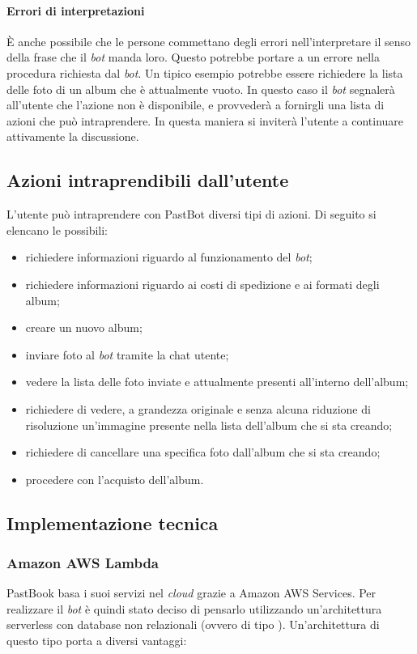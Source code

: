 \paragraph*{Errori di interpretazioni} È anche possibile che le persone
commettano degli errori nell'interpretare il senso della frase che il
\textit{bot} manda loro. Questo potrebbe portare a un errore nella procedura
richiesta dal \textit{bot}. Un tipico esempio potrebbe essere richiedere la
lista delle foto di un album che è attualmente vuoto. In questo caso il
\textit{bot} segnalerà all'utente che l'azione non è disponibile, e provvederà
a fornirgli una lista di azioni che può intraprendere. In questa maniera si
inviterà l'utente a continuare attivamente la discussione.

\subsection{Azioni intraprendibili dall'utente}

L'utente può intraprendere con PastBot diversi tipi di azioni. Di seguito si
elencano le possibili:

\begin{itemize}

  \item richiedere informazioni riguardo al funzionamento del \textit{bot};
  \item richiedere informazioni riguardo ai costi di spedizione e ai formati
degli album;
  \item creare un nuovo album;
  \item inviare foto al \textit{bot} tramite la chat utente;
  \item vedere la lista delle foto inviate e attualmente presenti all'interno
dell'album;
  \item richiedere di vedere, a grandezza originale e senza alcuna riduzione di
risoluzione un'immagine presente nella lista dell'album che si sta creando;
  \item richiedere di cancellare una specifica foto dall'album che si sta
creando;
  \item procedere con l'acquisto dell'album.
\end{itemize}

\subsection{Implementazione tecnica}

\subsubsection{Amazon AWS Lambda}
PastBook basa i suoi servizi nel \textit{cloud} grazie a Amazon AWS Services.
Per realizzare il \textit{bot} è quindi stato deciso di pensarlo utilizzando
un'architettura serverless con database non relazionali (ovvero di tipo
). Un'architettura di questo tipo porta a diversi
vantaggi:

